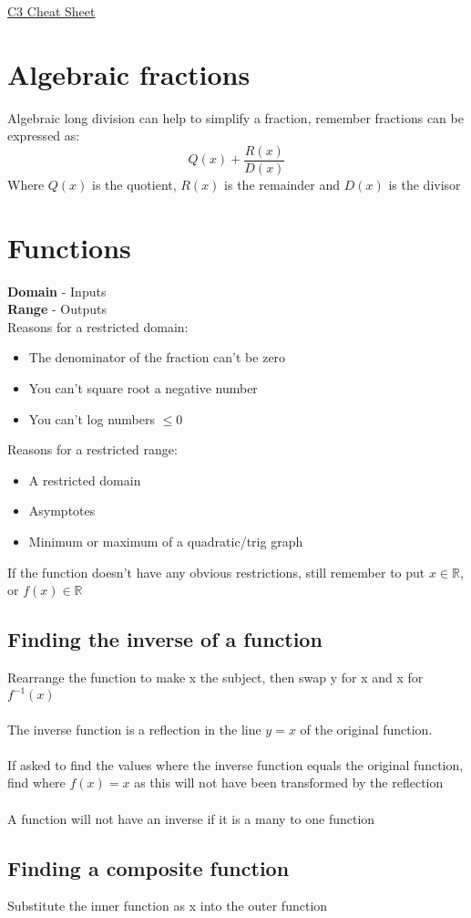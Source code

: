 \documentclass{article}[18pt]
\begin{document}
\begin{center}
\underline{\huge C3 Cheat Sheet}
\end{center}
\section{Algebraic fractions}
Algebraic long division can help to simplify a fraction, remember fractions can be expressed as:
$$Q(x)+\frac{R(x)}{D(x)}$$
Where $Q(x)$ is the quotient, $R(x)$ is the remainder and $D(x)$ is the divisor
\section{Functions}
\textbf{Domain} - Inputs\\
\textbf{Range} - Outputs\\
Reasons for a restricted domain:
\begin{itemize}
\item The denominator of the fraction can't be zero
\item You can't square root a negative number
\item You can't log numbers $\leqslant0$
\end{itemize}
Reasons for a restricted range:
\begin{itemize}
\item A restricted domain
\item Asymptotes
\item Minimum or maximum of a quadratic/trig graph
\end{itemize}
If the function doesn't have any obvious restrictions, still remember to put $x\in\mathbb{R}$, or $f(x)\in\mathbb{R}$
\subsection{Finding the inverse of a function}
Rearrange the function to make x the subject, then swap y for x and x for $f^{-1}(x)$\\
\\
The inverse function is a reflection in the line $y=x$ of the original function.\\
\\
If asked to find the values where the inverse function equals the original function, find where $f(x)=x$ as this will not have been transformed by the reflection\\
\\
A function will not have an inverse if it is a many to one function 
\subsection{Finding a composite function}
Substitute the inner function as x into the outer function
\end{document}
